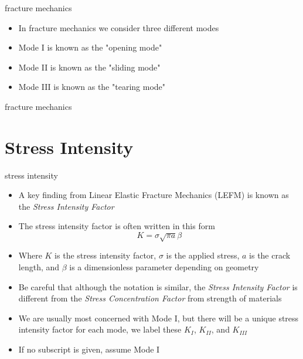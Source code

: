 \documentclass[10pt]{beamer}
\begin{document}
\begin{frame}{fracture mechanics}
	\begin{itemize}
		\item In fracture mechanics we consider three different modes
		\item Mode I is known as the "opening mode"
		\item Mode II is known as the "sliding mode"
		\item Mode III is known as the "tearing mode"
	\end{itemize}
\end{frame}

\begin{frame}{fracture mechanics}
	\begin{figure}
	\def\svgwidth{\linewidth}
	
	\end{figure}
\end{frame}

\section{Stress Intensity}

\begin{frame}{stress intensity}
	\begin{itemize}
		\item A key finding from Linear Elastic Fracture Mechanics (LEFM) is known as the \emph{Stress Intensity Factor}
		\item The stress intensity factor is often written in this form
		\begin{equation}
		K = \sigma\sqrt{\pi a} \beta
		\end{equation}
		\item Where $K$ is the stress intensity factor, $\sigma$ is the applied stress, $a$ is the crack length, and $\beta$ is a dimensionless parameter depending on geometry
		\item Be careful that although the notation is similar, the \emph{Stress Intensity Factor} is different from the \emph{Stress Concentration Factor} from strength of materials
		\item We are usually most concerned with Mode I, but there will be a unique stress intensity factor for each mode, we label these $K_I$, $K_{II}$, and $K_{III}$
		\item If no subscript is given, assume Mode I
	\end{itemize}
\end{frame}
\end{document}
